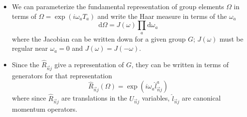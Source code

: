 \begin{itemize}
\begin{itemize}
\begin{align*}
           &= \int \text{d}\Omega \exp[\alpha \operatorname{Re}\operatorname{Tr}[\Omega]]\langle U^\prime | \Omega U \rangle \\
           &= \exp[\alpha \operatorname{Re}\operatorname{Tr}[U U^{\dagger \prime}]]
       \end{align*}
       which is the form in Eq.~\eqref{eq:TkME} (note we used that $\langle U^\prime | \Omega U \rangle =\delta(\Omega-U^\prime U^\dagger)$).
       \item We can parameterize the fundamental representation of group elements $\Omega$ in terms of $\Omega = \exp(i \omega_a T_a)$ and write the Haar measure in terms of the $\omega_a$
       \begin{equation}
           \text{d}\Omega = J(\omega) \prod_a \text{d}\omega_a
       \end{equation}
       where the Jacobian can be written down for a given group $G$; $J(\omega)$ must be regular near $\omega_a = 0$ and $J(\omega) = J(-\omega)$.
       \item Since the $\hat{R}_{\vec{n}j}$ give a representation of $G$, they can be written in terms of generators for that representation
       \begin{equation}
           \hat{R}_{\vec{n}j}(\Omega) = \exp(i \omega_a \hat{l}_{\vec{n}j}^a)
       \end{equation}
       where since $\hat{R}_{\vec{n}j}$ are translations in the $U_{\vec{n}j}$ variables, $\hat l_{\vec{n}j}$ are canonical momentum operators.


\end{itemize}
\end{itemize}
